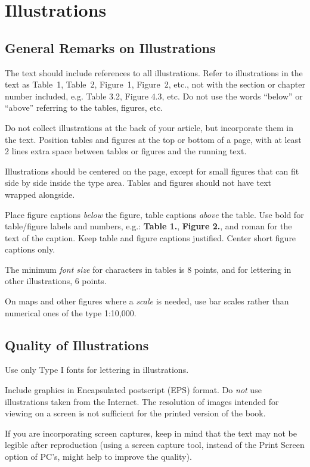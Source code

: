 \documentclass{IOS-Book-Article}
\begin{document}
\section{Illustrations}

\subsection{General Remarks on Illustrations}
The text should include references to all illustrations. Refer to illustrations in the
text as Table~1, Table~2, Figure~1, Figure~2, etc., not with the section or chapter number
included, e.g. Table 3.2, Figure 4.3, etc. Do not use the words ``below'' or ``above''
referring to the tables, figures, etc.

Do not collect illustrations at the back of your article, but incorporate them in the
text. Position tables and figures at the top or bottom of a page, with at least 2 lines
extra space between tables or figures and the running text.

Illustrations should be centered on the page, except for small figures that can fit
side by side inside the type area. Tables and figures should not have text wrapped
alongside.

Place figure captions \textit{below} the figure, table captions \textit{above} the table.
Use bold for table/figure labels and numbers, e.g.: \textbf{Table 1.}, \textbf{Figure 2.},
and roman for the text of the caption. Keep table and figure captions justified. Center
short figure captions only.

The minimum \textit{font size} for characters in tables is 8 points, and for lettering in other
illustrations, 6 points.

On maps and other figures where a \textit{scale} is needed, use bar scales rather than
numerical ones of the type 1:10,000.

\subsection{Quality of Illustrations}
Use only Type I fonts for lettering in illustrations.

Include graphics in Encapsulated postscript (EPS) format. Do \textit{not} use illustrations
taken from the Internet. The resolution of images intended for viewing on a screen is
not sufficient for the printed version of the book.

If you are incorporating screen captures, keep in mind that the text may not be
legible after reproduction (using a screen capture tool, instead of the Print Screen
option of PC's, might help to improve the quality).
\end{document}
